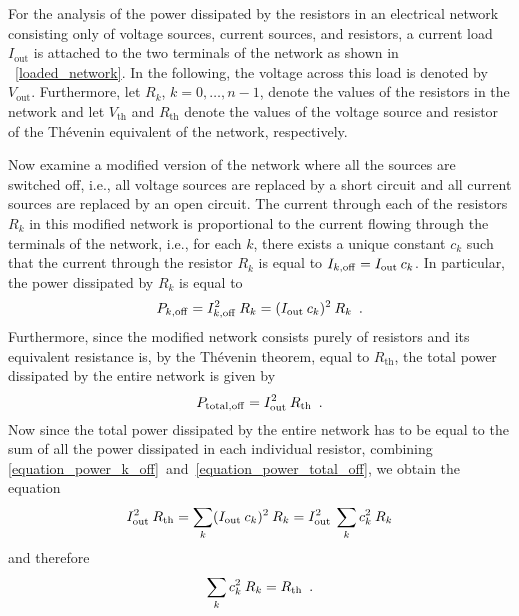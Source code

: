 \documentclass[twoside]{IEEEtran}
\newcommand{\mult}{\nonscript\:}
\newcommand{\opoff}{{\operatorname{off}}}
\newcommand{\opout}{{\operatorname{out}}}
\newcommand{\opth}{{\operatorname{th}}}
\newcommand{\optotal}{{\operatorname{total}}}
\begin{document}
For the analysis of the power dissipated by the resistors in an electrical network consisting only of voltage sources, current sources, and resistors, a current load $I_{\opout}$ is attached to the two terminals of the network as shown in \figurename~\ref{loaded_network}.
In the following, the voltage across this load is denoted by $V_{\opout}$.
Furthermore, let $R_{k}$, $k = 0, \ldots, n - 1$, denote the values of the resistors in the network and let $V_{\opth}$ and $R_{\opth}$ denote the values of the voltage source and resistor of the Th\'{e}venin equivalent of the network, respectively.

Now examine a modified version of the network where all the sources are switched off, i.e., all voltage sources are replaced by a short circuit and all current sources are replaced by an open circuit.
The current through each of the resistors $R_{k}$ in this modified network is proportional to the current flowing through the terminals of the network, i.e., for each $k$, there exists a unique constant $c_{k}$ such that the current through the resistor $R_{k}$ is equal to $I_{k, \opoff} = I_{\opout} \mult c_{k}$.
In particular, the power dissipated by $R_{k}$ is equal to
\begin{equation}
    P_{k, \opoff}
  = I_{k, \opoff}^{2} \mult R_{k}
  = (I_{\opout} \mult c_{k})^{2} \mult R_{k}
  \enskip.
  \label{equation_power_k_off}
\end{equation}
Furthermore, since the modified network consists purely of resistors and its equivalent resistance is, by the Th\'{e}venin theorem, equal to $R_{\opth}$, the total power dissipated by the entire network is given by
\begin{equation}
    P_{\optotal, \opoff}
  = I_{\opout}^{2} \mult R_{\opth}
  \enskip.
  \label{equation_power_total_off}
\end{equation}
Now since the total power dissipated by the entire network has to be equal to the sum of all the power dissipated in each individual resistor, combining \eqref{equation_power_k_off}~and~\eqref{equation_power_total_off}, we obtain the equation
\begin{displaymath}
    I_{\opout}^{2} \mult R_{\opth}
  = \sum_{k} (I_{\opout} \mult c_{k})^{2} \mult R_{k}
  = I_{\opout}^{2} \mult \sum_{k} c_{k}^{2} \mult R_{k}
\end{displaymath}
and therefore
\begin{equation}
    \sum_{k} c_{k}^{2} \mult R_{k}
  = R_{\opth}
  \enskip.
  \label{equation_leading_coefficient}
\end{equation}
\end{document}
